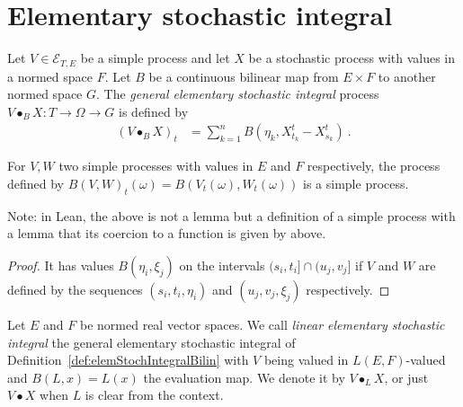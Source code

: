 \section{Elementary stochastic integral}

\begin{definition}\label{def:elemStochIntegralBilin}
  \leanok
Let $V \in \mathcal{E}_{T, E}$ be a simple process and let $X$ be a stochastic process with values in a normed space $F$.
Let $B$ be a continuous bilinear map from $E \times F$ to another normed space $G$.
The \emph{general elementary stochastic integral} process $V \bullet_B X : T \to \Omega \to G$ is defined by
\begin{align*}
  (V \bullet_B X)_t
  &= \sum_{k=1}^{n} B (\eta_k, X^t_{t_k} - X^t_{s_k})
  \: .
\end{align*}
\end{definition}


\begin{lemma}\label{lem:simpleProcess_map2}
  \leanok
For $V, W$ two simple processes with values in $E$ and $F$ respectively, the process defined by $B(V, W)_t(\omega) = B(V_t(\omega), W_t(\omega))$ is a simple process.

Note: in Lean, the above is not a lemma but a definition of a simple process with a lemma that its coercion to a function is given by above.
\end{lemma}

\begin{proof}
  \leanok
It has values $B(\eta_i, \xi_j)$ on the intervals $(s_i, t_i] \cap (u_j, v_j]$ if $V$ and $W$ are defined by the sequences $(s_i, t_i, \eta_i)$ and $(u_j, v_j, \xi_j)$ respectively.
\end{proof}


\begin{definition}\label{def:elemStochIntegralLinear}
  \leanok
Let $E$ and $F$ be normed real vector spaces.
We call \emph{linear elementary stochastic integral} the general elementary stochastic integral of Definition~\ref{def:elemStochIntegralBilin} with $V$ being valued in $L(E, F)$-valued and $B(L, x) = L(x)$ the evaluation map.
We denote it by $V \bullet_L X$,
or just $V \bullet X$ when $L$ is clear from the context.
\end{definition}


